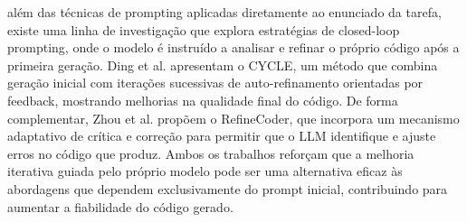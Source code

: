 além das técnicas de prompting aplicadas diretamente ao enunciado da tarefa, existe uma linha de investigação que explora estratégias de closed-loop prompting, onde o modelo é instruído a analisar e refinar o próprio código após a primeira geração. Ding et al.\cite{PECYCLE} apresentam o CYCLE, um método que combina geração inicial com iterações sucessivas de auto-refinamento orientadas por feedback, mostrando melhorias na qualidade final do código. De forma complementar, Zhou et al.\cite{PEREFINERCODE} propõem o RefineCoder, que incorpora um mecanismo adaptativo de crítica e correção para permitir que o LLM identifique e ajuste erros no código que produz. Ambos os trabalhos reforçam que a melhoria iterativa guiada pelo próprio modelo pode ser uma alternativa eficaz às abordagens que dependem exclusivamente do prompt inicial, contribuindo para aumentar a fiabilidade do código gerado.
